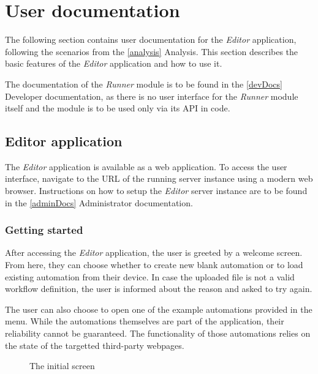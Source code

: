 \section{User documentation} \label{userDocs}

The following section contains user documentation for the \textit{Editor} application, following the scenarios from the \autoref{analysis} Analysis.
This section describes the basic features of the \textit{Editor} application and how to use it.

The documentation of the \textit{Runner} module is to be found in the \autoref{devDocs} Developer documentation, as there is no user interface for the \textit{Runner} module itself and the module is to be used only via its \ac{API} in code.

\subsection{Editor application}

The \textit{Editor} application is available as a web application.
To access the user interface, navigate to the URL of the running server instance using a modern web browser.
Instructions on how to setup the \textit{Editor} server instance are to be found in the \autoref{adminDocs} Administrator documentation.

\subsubsection{Getting started}

After accessing the \textit{Editor} application, the user is greeted by a welcome screen.
From here, they can choose whether to create new blank automation or to load existing automation from their device.
In case the uploaded file is not a valid workflow definition, the user is informed about the reason and asked to try again.

The user can also choose to open one of the example automations provided in the menu.
While the automations themselves are part of the application, their reliability cannot be guaranteed.
The functionality of those automations relies on the state of the targetted third-party webpages.

\begin{figure}[!h]
    \begin{center}
    \end{center}
    \caption{The initial screen}
\end{figure}
\clearpage

